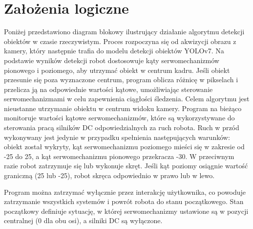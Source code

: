 \documentclass[a4paper,twoside,12pt]{book}
\begin{document}
\section{Założenia logiczne}
Poniżej przedstawiono diagram blokowy ilustrujący działanie algorytmu detekcji obiektów w czasie rzeczywistym. Proces rozpoczyna się od akwizycji obrazu z kamery, który następnie trafia do modelu detekcji obiektów YOLOv7. Na podstawie wyników detekcji robot dostosowuje kąty serwomechanizmów pionowego i poziomego, aby utrzymać obiekt w centrum kadru. Jeśli obiekt przesunie się poza wyznaczone centrum, program oblicza różnicę w pikselach i przelicza ją na odpowiednie wartości kątowe, umożliwiając sterowanie serwomechanizmami w celu zapewnienia ciągłości śledzenia. Celem algorytmu jest nieustanne utrzymanie obiektu w centrum widoku kamery.
Program na bieżąco monitoruje wartości kątowe serwomechanizmów, które są wykorzystywane do sterowania pracą silników DC odpowiedzialnych za ruch robota. Ruch w przód wykonywany jest jedynie w przypadku spełnienia następujących warunków: obiekt został wykryty, kąt serwomechanizmu poziomego mieści się w zakresie od -25\textdegree{} do 25\textdegree{}, a kąt serwomechanizmu pionowego przekracza -30\textdegree{}. W przeciwnym razie robot zatrzymuje się lub wykonuje skręt. Jeśli kąt poziomy osiągnie wartość graniczną (25\textdegree{} lub -25\textdegree{}), robot skręca odpowiednio w prawo lub w lewo.

Program można zatrzymać wyłącznie przez interakcję użytkownika, co powoduje zatrzymanie wszystkich systemów i powrót robota do stanu początkowego. Stan początkowy definiuje sytuację, w której serwomechanizmy ustawione są w pozycji centralnej (0\textdegree{} dla obu osi), a silniki DC są wyłączone.
\end{document}
